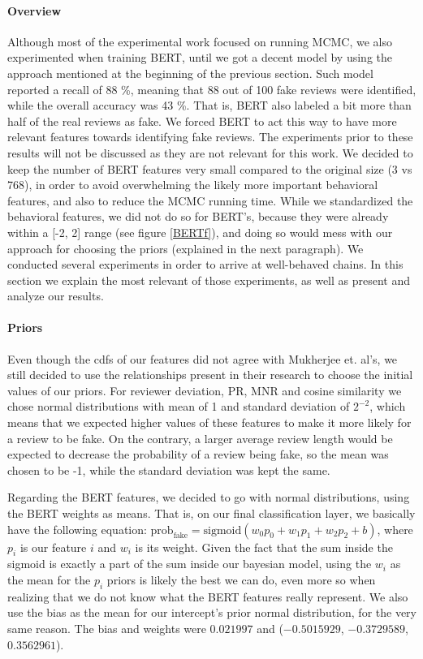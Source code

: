 \documentclass[man, floatsintext, 10pt]{apa6}
\begin{document}
\paragraph{Overview} Although most of the experimental work focused on running MCMC, we also experimented when training BERT, until we got a decent model by using the approach mentioned at the beginning of the previous section. Such model reported a recall of 88 \%, meaning that 88 out of 100 fake reviews were identified, while the overall accuracy was 43 \%. That is, BERT also labeled a bit more than half of the real reviews as fake. We forced BERT to act this way to have more relevant features towards identifying fake reviews. The experiments prior to these results will not be discussed as they are not relevant for this work. We decided to keep the number of BERT features very small compared to the original size (3 vs 768), in order to avoid overwhelming the likely more important behavioral features, and also to reduce the MCMC running time. While we standardized the behavioral features, we did not do so for BERT's, because they were already within a [-2, 2] range (see figure \ref{BERTf}), and doing so would mess with our approach for choosing the priors (explained in the next paragraph). We conducted several experiments in order to arrive at well-behaved chains. In this section we explain the most relevant of those experiments, as well as present and analyze our results. 

\vspace{2mm}

\paragraph{Priors} Even though the cdfs of our features did not agree with Mukherjee et. al's, we still decided to use the relationships present in their research to choose the initial values of our priors. For reviewer deviation, PR, MNR and cosine similarity we chose normal distributions with mean of 1 and standard deviation of $2^{-2}$, which means that we expected higher values of these features to make it more likely for a review to be fake. On the contrary, a larger average review length would be expected to decrease the probability of a review being fake, so the mean was chosen to be -1, while the standard deviation was kept the same.

Regarding the BERT features, we decided to go with normal distributions, using the BERT weights as means. That is, on our final classification layer, we basically have the following equation: $\text{prob}_{\text{fake}} = \text{sigmoid} (w_0 p_0 + w_1 p_1 + w_2 p_2 + b)$, where $p_i$ is our feature $i$ and $w_i$ is its weight. Given the fact that the sum inside the sigmoid is exactly a part of the sum inside our bayesian model, using the $w_i$ as the mean for the $p_i$ priors is likely the best we can do, even more so when realizing that we do not know what the BERT features really represent. We also use the bias as the mean for our intercept's prior normal distribution, for the very same reason. The bias and weights were $0.021997$ and ($-0.5015929$, $-0.3729589$, $0.3562961$). 
\end{document}

